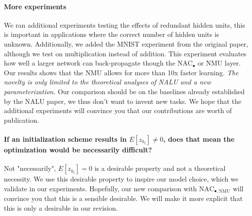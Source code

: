 \documentclass{article}
\begin{document}
\vspace{-0.5cm} \paragraph{More experiments} We ran additional experiments testing the effects of redundant hidden units, this is important in applications where the correct number of hidden units is unknown. Additionally, we added the MNIST experiment from the original paper, although we test on multiplication instead of addition. This experiment evaluates how well a larger network can back-propagate though the $\mathrm{NAC}_{\bullet}$ or NMU layer. Our results shows that the NMU allows for more than 10x faster learning. \textit{The novelty is only limited to the theoretical analyses of NALU and a new parameterization.} Our comparison should be on the baselines already established by the NALU paper, we thus don't want to invent new tasks. We hope that the additional experiments will convince you that our contributions are worth of publication. %

\vspace{-0.3cm} \paragraph{If an initialization scheme results in $E[z_{h_l}] \ne 0$, does that mean the optimization would be necessarily difficult?} Not "necessarily", $E[z_{h_l}] = 0$ is a desirable property and not a theoretical necessity. We use this desirable property to inspire our model choice, which we validate in our experiments. Hopefully, our new comparison with $\mathrm{NAC}_{\bullet, \mathrm{NMU}}$ will convince you that this is a sensible desirable. We will make it more explicit that this is only a desirable in our revision.
\end{document}
